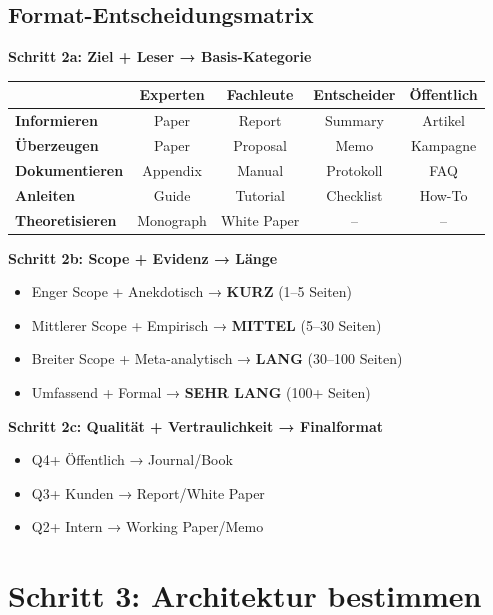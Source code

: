 \documentclass[12pt,a4paper]{article}
\begin{document}
\subsection{Format-Entscheidungsmatrix}

\textbf{Schritt 2a: Ziel + Leser → Basis-Kategorie}

\begin{table}[htbp]
\centering
\begin{tabular}{@{}l|cccc@{}}
\toprule
& \textbf{Experten} & \textbf{Fachleute} & \textbf{Entscheider} & \textbf{Öffentlich} \\
\midrule
\textbf{Informieren} & Paper & Report & Summary & Artikel \\
\textbf{Überzeugen} & Paper & Proposal & Memo & Kampagne \\
\textbf{Dokumentieren} & Appendix & Manual & Protokoll & FAQ \\
\textbf{Anleiten} & Guide & Tutorial & Checklist & How-To \\
\textbf{Theoretisieren} & Monograph & White Paper & -- & -- \\
\bottomrule
\end{tabular}
\end{table}

\textbf{Schritt 2b: Scope + Evidenz → Länge}

\begin{itemize}[nosep]
\item Enger Scope + Anekdotisch → \textbf{KURZ} (1--5 Seiten)
\item Mittlerer Scope + Empirisch → \textbf{MITTEL} (5--30 Seiten)
\item Breiter Scope + Meta-analytisch → \textbf{LANG} (30--100 Seiten)
\item Umfassend + Formal → \textbf{SEHR LANG} (100+ Seiten)
\end{itemize}

\textbf{Schritt 2c: Qualität + Vertraulichkeit → Finalformat}

\begin{itemize}[nosep]
\item Q4+ Öffentlich → Journal/Book
\item Q3+ Kunden → Report/White Paper
\item Q2+ Intern → Working Paper/Memo
\end{itemize}


\section{Schritt 3: Architektur bestimmen}
\end{document}
